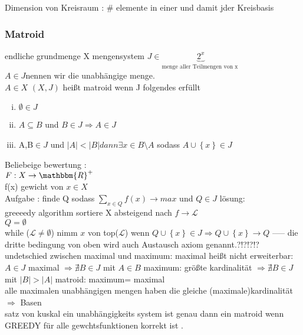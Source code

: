 \documentclass[a4paper]{article}
\theoremstyle{definition}
\theoremstyle{remark}
\begin{document}
Dimension von Kreisraum : \# elemente in einer und damit jder Kreisbasis\\

\subsubsection{Matroid}
\label{ssub:matroid}

endliche grundmenge X mengensystem $J\in \underbrace{2^x}_{\textrm{menge aller Teilmengen von x }} $\\
 $ A\in J$nennen wir die unabhängige menge.\\
 $A\in X$
 $(X,J)$ heißt matroid wenn J folgendes erfüllt
 \begin{enumerate}[(i)]
   \item $\emptyset \in J$
   \item $A\subseteq B$ und $ B\in J \Rightarrow A\in J$
   \item A,B$\in J$ und $|A|<|B| dann \exists x \in B\setminus A$ sodass $ A\cup \left\{ x \right\}\in J$
 \end{enumerate}
 Beliebeige bewertung :\\
 $F: X\rightarrow \mathbbm{R}^+$\\
 f(x) gewicht von $x\in X$\\
Aufgabe :
finde Q sodass $ \sum_{x\in Q} f(x) \rightarrow  max$  und $Q\in J$ 
lösung:\\
greeeedy algorithm sortiere X absteigend nach $f\rightarrow \mathcal{L}$\\
$ Q=\emptyset$\\
while ($\mathcal{L} \neq \emptyset$)
	nimm $x$ von top($\mathcal{L}$)
	wenn $Q\cup \left\{ x \right\}\in J \Rightarrow  Q\cup \left\{ x \right\} \rightarrow  Q$
-----
 die dritte bedingung von oben wird auch Austausch axiom genannt.?!?!?!?
 undetschied zwischen maximal und maximum:
 maximal heißt nicht erweiterbar: $A\in J$ maximal $\Rightarrow \nexists B \in J$ mit $A\in B$
 maximum:
größte kardinalität $\Rightarrow\nexists B\in J$ mit $|B|> |A|$
matroid: maximum= maximal\\
alle maximalen unabhängigen mengen haben die gleiche (maximale)kardinalität $\Rightarrow$ Basen\\

satz von kuskal ein unabhängigkeits system ist genau dann ein matroid wenn GREEDY für alle gewchtsfunktionen korrekt ist .


\end{document}
